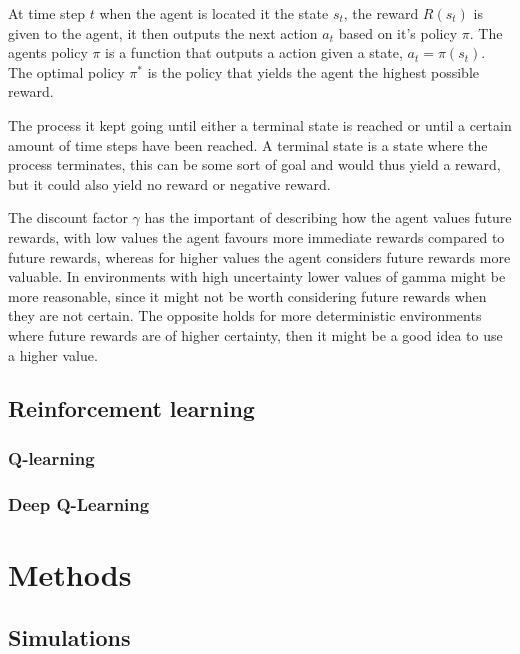 \documentclass{report}
\theoremstyle{definition}
\begin{document}
At time step $t$ when the agent is located it the state $s_t$, the reward $R(s_t)$ is given to the agent, it then outputs the next action $a_t$ based on it's policy $\pi$. The agents policy $\pi$ is a function that outputs a action given a state, $a_t = \pi(s_t)$. The optimal policy $\pi^*$ is the policy that yields the agent the highest possible reward. 

The process it kept going until either a terminal state is reached or until a certain amount of time steps have been reached. A terminal state is a state where the process terminates, this can be some sort of goal and would thus yield a reward, but it could also yield no reward or negative reward.

The discount factor $\gamma$ has the important of describing how the agent values future rewards, with low values the agent favours more immediate rewards compared to future rewards, whereas for higher values the agent considers future rewards more valuable. In environments with high uncertainty lower values of gamma might be more reasonable, since it might not be worth considering future rewards when they are not certain. The opposite holds for more deterministic environments where future rewards are of higher certainty, then it might be a good idea to use a higher value.


\section{Reinforcement learning}

\subsection{Q-learning}

\subsection{Deep Q-Learning}





\chapter{Methods}

\section{Simulations}
\end{document}

